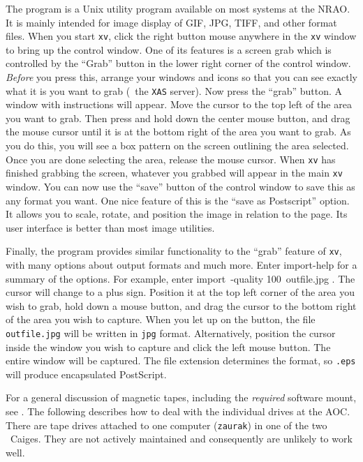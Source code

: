      The {\tt {}} program is a Unix utility program available
on most systems at the NRAO\@.  It is mainly intended for image
display of GIF, JPG, TIFF, and other format files.  When you start
{\tt xv}, click the right button mouse anywhere in the {\tt xv} window
to bring up the control window.  One of its features is a screen grab
which is controlled by the ``Grab'' button in the lower right corner
of the control window.  {\it Before\/} you press this, arrange your
windows and icons so that you can see exactly what it is you want to
grab (\eg\ the {\tt XAS} server).  Now press the ``grab'' button.  A
window with instructions will appear.  Move the cursor to the top left
of the area you want to grab.  Then press and hold down the center
mouse button, and drag the mouse cursor until it is at the bottom
right of the area you want to grab. As you do this, you will see a box
pattern on the screen outlining the area selected.  Once you are done
selecting the area, release the mouse cursor.  When {\tt xv} has
finished grabbing the screen, whatever you grabbed will appear in the
main {\tt xv} window.  You can now use the ``save'' button of the
control window to save this as any format you want.  One nice feature
of this is the ``save as Postscript'' option.  It allows you to scale,
rotate, and position the image in relation to the page.  Its user
interface is better than most image utilities.

     Finally, the {\tt {}} program provides similar
functionality to the ``grab'' feature of {\tt xv}, with many options
about output formats and much more.  Enter {\us import\qs -help \CR}
for a summary of the options.  For example, enter {\us import\qs\
-quality 100\qs\ outfile.jpg \CR}.  The cursor will change to a plus
sign.  Position it at the top left corner of the area you wish to
grab, hold down a mouse button, and drag the cursor to the bottom
right of the area you wish to capture.  When you let up on the button,
the file {\tt outfile.jpg} will be written in {\tt jpg} format.
Alternatively, position the cursor inside the window you wish to
capture and click the left mouse button.  The entire window will be
captured.  The file extension determines the format, so {\tt .eps}
will produce encapsulated PostScript.


    For a general discussion of magnetic tapes, including the {\it
required\/} software mount, see \Sec{magtape}.  The following
describes how to deal with the individual  drives at the
\hbox{AOC}.\iodx{magnetic tape}  There are tape drives attached to one
computer ({\tt zaurak}) in one of the two \AIPS\ Caiges.  They are not
actively maintained and consequently are unlikely to work well.

